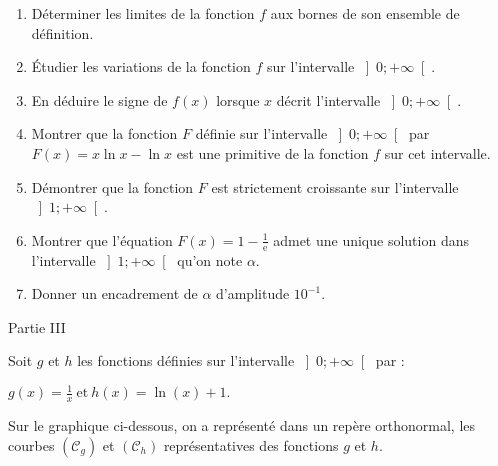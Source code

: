 \begin{enumerate}
     \item
     Déterminer les limites de la fonction $f$ aux bornes de son ensemble de définition.
     \item
     Étudier les variations de la fonction $f$ sur l'intervalle $\left]0; +\infty \right[$.
     \item
     En déduire le signe de $f\left(x\right)$ lorsque $x$ décrit l'intervalle $\left]0; +\infty \right[$.
     \item
     Montrer que la fonction $F$ définie sur l'intervalle $\left]0; +\infty \right[$ par $F\left(x\right)=x \ln x-\ln x$ est une primitive de la fonction $f$ sur cet intervalle.
     \item
     Démontrer que la fonction $F$ est strictement croissante sur l'intervalle $\left]1; +\infty \right[$.
     \item
     Montrer que l'équation $F\left(x\right)=1-\frac{1}{\text{e}}$ admet une unique solution dans l'intervalle $\left]1;+\infty \right[$ qu'on note $\alpha $.
     \item
     Donner un encadrement de $\alpha $ d'amplitude $10^{-1}$.
\end{enumerate}
\begin{h3} Partie III \end{h3}
Soit $g$ et $h$ les fonctions définies sur l'intervalle $\left]0; +\infty \right[$ par :
\par
$g\left(x\right)=\frac{1}{x}\   \text{et} \   h\left(x\right)=\ln \left(x\right)+1.$
\par
Sur le graphique ci-dessous, on a représenté dans un repère orthonormal, les courbes $\left(\mathscr C_{g}\right)$ et $\left(\mathscr C_{h}\right)$ représentatives des fonctions $g$ et $h$.

